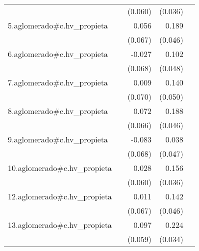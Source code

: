 {\begin{longtable}{l*{4}{D{.}{.}{-1}}}
            &                     &     (0.060)         &     (0.036)         &                     \\
\addlinespace
5.aglomerado#c.hv\_propieta&                     &       0.056         &       0.189\sym{***}&                     \\
            &                     &     (0.067)         &     (0.046)         &                     \\
\addlinespace
6.aglomerado#c.hv\_propieta&                     &      -0.027         &       0.102\sym{*}  &                     \\
            &                     &     (0.068)         &     (0.048)         &                     \\
\addlinespace
7.aglomerado#c.hv\_propieta&                     &       0.009         &       0.140\sym{**} &                     \\
            &                     &     (0.070)         &     (0.050)         &                     \\
\addlinespace
8.aglomerado#c.hv\_propieta&                     &       0.072         &       0.188\sym{***}&                     \\
            &                     &     (0.066)         &     (0.046)         &                     \\
\addlinespace
9.aglomerado#c.hv\_propieta&                     &      -0.083         &       0.038         &                     \\
            &                     &     (0.068)         &     (0.047)         &                     \\
\addlinespace
10.aglomerado#c.hv\_propieta&                     &       0.028         &       0.156\sym{***}&                     \\
            &                     &     (0.060)         &     (0.036)         &                     \\
\addlinespace
12.aglomerado#c.hv\_propieta&                     &       0.011         &       0.142\sym{**} &                     \\
            &                     &     (0.067)         &     (0.046)         &                     \\
\addlinespace
13.aglomerado#c.hv\_propieta&                     &       0.097         &       0.224\sym{***}&                     \\
            &                     &     (0.059)         &     (0.034)         &                     \\

\end{longtable}}
